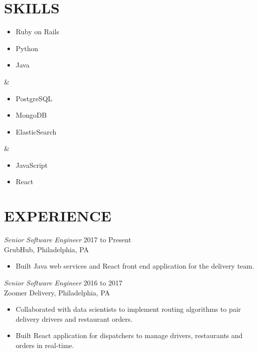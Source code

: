 \documentclass[line]{style}
\begin{document}
\newsectionwidth{0in}

\address{michaelcdalton@gmail.com}
\address{github.com/kcdragon / linkedin.com/in/michaelcdalton}

\begin{resume}

\section{SKILLS}
\begin{ncolumn}{3}
\begin{itemize} \itemsep -2pt
\item Ruby on Rails
\item Python
\item Java
\end{itemize}
&
\begin{itemize} \itemsep -2pt
\item PostgreSQL
\item MongoDB
\item ElasticSearch
\end{itemize}
&
\begin{itemize} \itemsep -2pt
\item JavaScript
\item React
\end{itemize}
\end{ncolumn}

\section{EXPERIENCE}

{\sl Senior Software Engineer} \hfill 2017 to Present \\
GrubHub, Philadelphia, PA
\begin{itemize} \itemsep -2pt
\item Built Java web services and React front end application for the delivery team.
\end{itemize}

{\sl Senior Software Engineer} \hfill 2016 to 2017 \\
Zoomer Delivery, Philadelphia, PA
\begin{itemize} \itemsep -2pt
\item Collaborated with data scientists to implement routing algorithms to pair delivery drivers and restaurant orders.
\item Built React application for dispatchers to manage drivers, restaurants and orders in real-time.
\end{itemize}


\end{resume}
\end{document}
